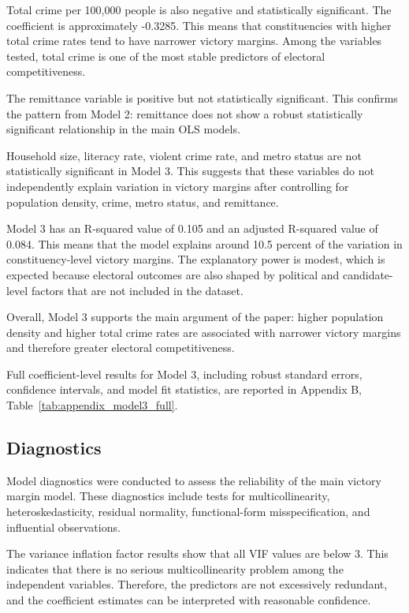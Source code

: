 \documentclass[12pt,a4paper]{article}
\begin{document}
Total crime per 100,000 people is also negative and statistically significant. The coefficient is approximately -0.3285. This means that constituencies with higher total crime rates tend to have narrower victory margins. Among the variables tested, total crime is one of the most stable predictors of electoral competitiveness.

The remittance variable is positive but not statistically significant. This confirms the pattern from Model 2: remittance does not show a robust statistically significant relationship in the main OLS models.

Household size, literacy rate, violent crime rate, and metro status are not statistically significant in Model 3. This suggests that these variables do not independently explain variation in victory margins after controlling for population density, crime, metro status, and remittance.

Model 3 has an R-squared value of 0.105 and an adjusted R-squared value of 0.084. This means that the model explains around 10.5 percent of the variation in constituency-level victory margins. The explanatory power is modest, which is expected because electoral outcomes are also shaped by political and candidate-level factors that are not included in the dataset.

Overall, Model 3 supports the main argument of the paper: higher population density and higher total crime rates are associated with narrower victory margins and therefore greater electoral competitiveness.

Full coefficient-level results for Model 3, including robust standard errors, confidence intervals, and model fit statistics, are reported in Appendix B, Table~\ref{tab:appendix_model3_full}.

\subsection{Diagnostics}

Model diagnostics were conducted to assess the reliability of the main victory margin model. These diagnostics include tests for multicollinearity, heteroskedasticity, residual normality, functional-form misspecification, and influential observations.

The variance inflation factor results show that all VIF values are below 3. This indicates that there is no serious multicollinearity problem among the independent variables. Therefore, the predictors are not excessively redundant, and the coefficient estimates can be interpreted with reasonable confidence.
\end{document}

